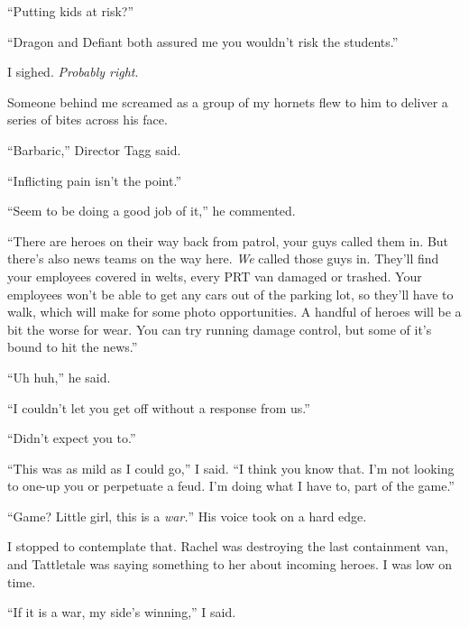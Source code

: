 ``Putting kids at risk?''



``Dragon and Defiant both assured me you wouldn't risk the students.''



I sighed.  \emph{Probably right}.



Someone behind me screamed as a group of my hornets flew to him to deliver a series of bites across his face.



``Barbaric,'' Director Tagg said.



``Inflicting pain isn't the point.''



``Seem to be doing a good job of it,'' he commented.



``There are heroes on their way back from patrol, your guys called them in.  But there's also news teams on the way here.  \emph{We} called those guys in.  They'll find your employees covered in welts, every PRT van damaged or trashed.  Your employees won't be able to get any cars out of the parking lot, so they'll have to walk, which will make for some photo opportunities.  A handful of heroes will be a bit the worse for wear.  You can try running damage control, but some of it's bound to hit the news.''



``Uh huh,'' he said.



``I couldn't let you get off without a response from us.''



``Didn't expect you to.''



``This was as mild as I could go,'' I said.  ``I think you know that.  I'm not looking to one-up you or perpetuate a feud.  I'm doing what I have to, part of the game.''



``Game?  Little girl, this is a \emph{war.}''  His voice took on a hard edge.



I stopped to contemplate that.  Rachel was destroying the last containment van, and Tattletale was saying something to her about incoming heroes.  I was low on time.



``If it is a war, my side's winning,'' I said.



